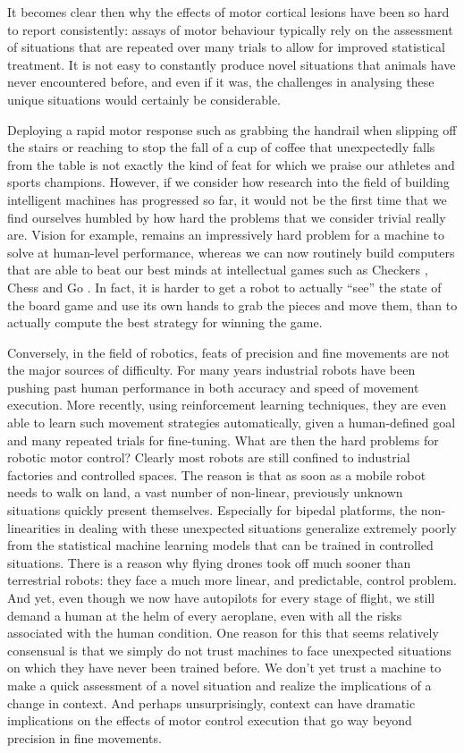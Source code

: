 It becomes clear then why the effects of motor cortical lesions have been so hard to report consistently: assays of motor behaviour typically rely on the assessment of situations that are repeated over many trials to allow for improved statistical treatment. It is not easy to constantly produce novel situations that animals have never encountered before, and even if it was, the challenges in analysing these unique situations would certainly be considerable.

Deploying a rapid motor response such as grabbing the handrail when slipping off the stairs or reaching to stop the fall of a cup of coffee that unexpectedly falls from the table is not exactly the kind of feat for which we praise our athletes and sports champions. However, if we consider how research into the field of building intelligent machines has progressed so far, it would not be the first time that we find ourselves humbled by how hard the problems that we consider trivial really are. Vision for example, remains an impressively hard problem for a machine to solve at human-level performance, whereas we can now routinely build computers that are able to beat our best minds at intellectual games such as Checkers \cite{Samuel1959}, Chess \cite{Lai2015} and Go \cite{Silver2016}. In fact, it is harder to get a robot to actually ``see'' the state of the board game and use its own hands to grab the pieces and move them, than to actually compute the best strategy for winning the game.

Conversely, in the field of robotics, feats of precision and fine movements are not the major sources of difficulty. For many years industrial robots have been pushing past human performance in both accuracy and speed of movement execution. More recently, using reinforcement learning techniques, they are even able to learn such movement strategies automatically, given a human-defined goal and many repeated trials for fine-tuning. What are then the hard problems for robotic motor control? Clearly most robots are still confined to industrial factories and controlled spaces. The reason is that as soon as a mobile robot needs to walk on land, a vast number of non-linear, previously unknown situations quickly present themselves. Especially for bipedal platforms, the non-linearities in dealing with these unexpected situations generalize extremely poorly from the statistical machine learning models that can be trained in controlled situations. There is a reason why flying drones took off much sooner than terrestrial robots: they face a much more linear, and predictable, control problem. And yet, even though we now have autopilots for every stage of flight, we still demand a human at the helm of every aeroplane, even with all the risks associated with the human condition. One reason for this that seems relatively consensual is that we simply do not trust machines to face unexpected situations on which they have never been trained before. We don't yet trust a machine to make a quick assessment of a novel situation and realize the implications of a change in context. And perhaps unsurprisingly, context can have dramatic implications on the effects of motor control execution that go way beyond precision in fine movements.

